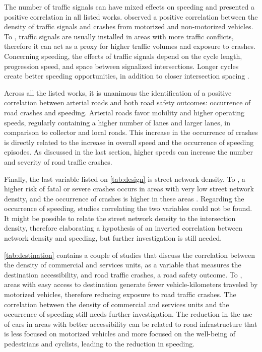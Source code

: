 The number of traffic signals can have mixed effects on speeding and presented a positive correlation in all listed works. \textcite{Lovegrove2006,Lee2015} observed a positive correlation between the density of traffic signals and crashes from motorized and non-motorized vehicles. To \textcite{Obelheiro2020}, traffic signals are usually installed in areas with more traffic conflicts, therefore it can act as a proxy for higher traffic volumes and exposure to crashes. Concerning speeding, the effects of traffic signals depend on the cycle length, progression speed, and space between signalized intersections. Longer cycles create better speeding opportunities, in addition to closer intersection spacing \cite{Elvik2009,Furth2018}. 

Across all the listed works, it is unanimous the identification of a positive correlation between arterial roads and both road safety outcomes: occurrence of road crashes and speeding. Arterial roads favor mobility and higher operating speeds, regularly containing a higher number of lanes and larger lanes, in comparison to collector and local roads. This increase in the occurrence of crashes is directly related to the increase in overall speed and the occurrence of speeding episodes. As discussed in the last section, higher speeds can increase the number and severity of road traffic crashes. 

Finally, the last variable listed on \autoref{tab:design} is street network density. To \textcite{Marshall2010}, a higher risk of fatal or severe crashes occurs in areas with very low street network density, and the occurrence of crashes is higher in these areas \cite{Marshall2011}. Regarding the occurrence of speeding, studies correlating the two variables could not be found. It might be possible to relate the street network density to the intersection density, therefore elaborating a hypothesis of an inverted correlation between network density and speeding, but further investigation  is still needed. 

\autoref{tab:destination} contains a couple of studies that discuss the correlation between the density of commercial and services units, as a variable that measures the destination accessibility, and road traffic crashes, a road safety outcome. To \textcite{Ouyang2014,Welle2016}, areas with easy access to destination generate fewer vehicle-kilometers traveled by motorized vehicles, therefore reducing exposure to road traffic crashes. The correlation between the density of commercial and services units and the occurrence of speeding still needs further investigation. The reduction in the use of cars in areas with better accessibility can be related to road infrastructure that is less focused on motorized vehicles and more focused on the well-being of pedestrians and cyclists, leading to the reduction in speeding. 

